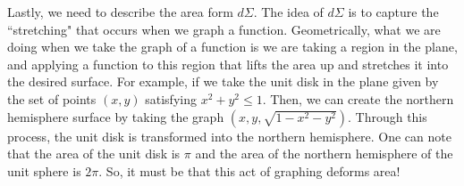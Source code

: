                                       Lastly, we need to describe the area form $d\Sigma$.  The idea of $d\Sigma$ is to capture the ``stretching" that occurs when we graph a function.  Geometrically, what we are doing when we take the graph of a function is we are taking a region in the plane, and applying a function to this region that lifts the area up and stretches it into the desired surface.  For example, if we take the unit disk in the plane given by the set of points $(x,y)$ satisfying $x^2+y^2\leq 1$.  Then, we can create the northern hemisphere surface by taking the graph $(x,y,\sqrt{1-x^2-y^2})$.  Through this process, the unit disk is transformed into the northern hemisphere.  One can note that the area of the unit disk is $\pi$ and the area of the northern hemisphere of the unit sphere is $2\pi$.  So, it must be that this act of graphing deforms area! 
                                      
